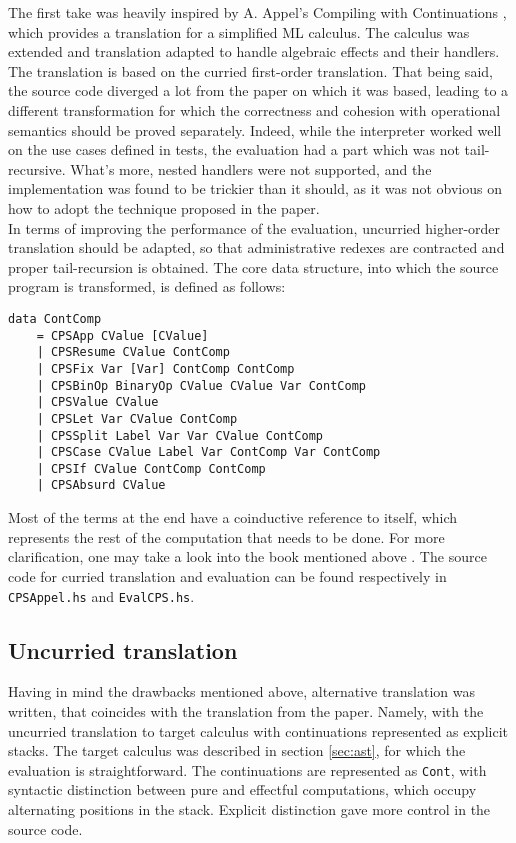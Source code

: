 \documentclass{article}
\theoremstyle{definition}
\theoremstyle{lemma}
\theoremstyle{observation}
\theoremstyle{theorem}
\begin{document}
    The first take was heavily inspired by A. Appel's Compiling with Continuations
    \cite{appel-continuations}, which provides a translation for a simplified ML
    calculus. The calculus was extended and translation adapted to handle algebraic
    effects and their handlers. The translation is based on the curried first-order
    translation. That being said, the source code diverged a lot from the paper on
    which it was based, leading to a different transformation for which
    the correctness and cohesion with operational semantics should be proved
    separately. Indeed, while the interpreter worked well on the use cases
    defined in tests, the evaluation had a part which was not tail-recursive. What's
    more, nested handlers were not supported, and the implementation was found to be
    trickier than it should, as it was not obvious on how to adopt the technique
    proposed in the paper. \\

    In terms of improving the performance of the evaluation, uncurried higher-order
    translation should be adapted, so that administrative redexes are contracted
    and proper tail-recursion is obtained. The core data structure, into which the
    source program is transformed, is defined as follows:

    \begin{verbatim}
data ContComp
    = CPSApp CValue [CValue]
    | CPSResume CValue ContComp
    | CPSFix Var [Var] ContComp ContComp
    | CPSBinOp BinaryOp CValue CValue Var ContComp
    | CPSValue CValue
    | CPSLet Var CValue ContComp
    | CPSSplit Label Var Var CValue ContComp
    | CPSCase CValue Label Var ContComp Var ContComp
    | CPSIf CValue ContComp ContComp
    | CPSAbsurd CValue
    \end{verbatim}
    Most of the terms at the end have a coinductive reference to itself, which represents
    the rest of the computation that needs to be done. For more clarification,
    one may take a look into the book mentioned above \cite{appel-continuations}. The source code for curried
    translation and evaluation can be found respectively in \verb!CPSAppel.hs! and
    \verb!EvalCPS.hs!.

    \subsection{Uncurried translation}

    Having in mind the drawbacks mentioned above, alternative translation was
    written, that coincides with the translation from the paper. Namely, with
    the uncurried translation to target calculus with continuations represented
    as explicit stacks. The target calculus was described in section \ref{sec:ast},
    for which the evaluation is straightforward. The continuations are represented
    as \verb!Cont!, with syntactic distinction between pure and effectful computations,
    which occupy alternating positions in the stack. Explicit distinction gave
    more control in the source code.
\end{document}

